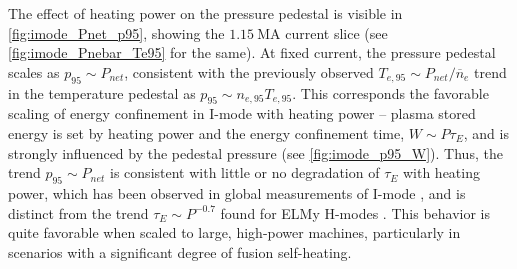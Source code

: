 The effect of heating power on the pressure pedestal is visible in \cref{fig:imode_Pnet_p95}, showing the $\SI{1.15}{\mega\ampere}$ current slice (see \cref{fig:imode_Pnebar_Te95} for the same).  At fixed current, the pressure pedestal scales as $p_{95} \sim P_{net}$, consistent with the previously observed $T_{e,95} \sim P_{net}/\overline{n}_e$ trend in the temperature pedestal as $p_{95} \sim n_{e,95} T_{e,95}$.  This corresponds the favorable scaling of energy confinement in I-mode with heating power -- plasma stored energy is set by heating power and the energy confinement time, $W \sim P \tau_E$, and is strongly influenced by the pedestal pressure (see \cref{fig:imode_p95_W}).  Thus, the trend $p_{95} \sim P_{net}$ is consistent with little or no degradation of $\tau_E$ with heating power, which has been observed in global measurements of I-mode \cite{Dominguez2012,Whyte2010}, and is distinct from the trend $\tau_E \sim P^{-0.7}$ found for ELMy H-modes \cite{ITER1999}.  This behavior is quite favorable when scaled to large, high-power machines, particularly in scenarios with a significant degree of fusion self-heating.

\begin{figure}[t]
 \pushtooutside
\end{figure}

